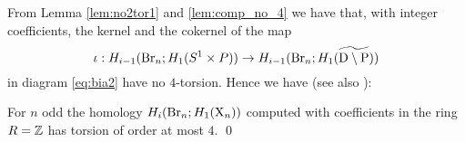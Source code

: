 From Lemma \ref{lem:no2tor1} and \ref{lem:comp_no_4} we have that, with integer coefficients, the kernel and the cokernel of the map $$\iota:H_{i-1}(\operatorname{Br}_n; H_1(S^1 \times P)) \to H_{i-1}(\operatorname{Br}_n; H_1(\widetilde{\mathrm{D} \setminus \mathrm{P}}))$$ in diagram \eqref{eq:bia2} have no $4$-torsion. 
Hence we have (see also \cite{bianchi}):
\begin{thm}\label{thm:4tor}
For $n$ odd the homology $H_{i}(\operatorname{Br}_n; H_1(\mathrm{X}_n))$ computed with coefficients in the ring $R = \mathbb{Z}$ has torsion of order at most $4$. \qed
\end{thm}
